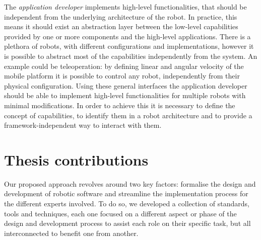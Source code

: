 The \textit{application developer} implements high-level functionalities, that should be independent from the underlying architecture of the robot. In practice, this means it should exist an abstraction layer between the low-level capabilities provided by one or more components and the high-level applications. There is a plethora of robots, with different configurations and implementations, however it is possible to abstract most of the capabilities independently from the system. An example could be teleoperation: by defining linear and angular velocity of the mobile platform it is possible to control any robot, independently from their physical configuration. Using these general interfaces the application developer should be able to implement high-level functionalities for multiple robots with minimal modifications. In order to achieve this it is necessary to define the concept of capabilities, to identify them in a robot architecture and to provide a framework-independent way to interact with them.

\section{Thesis contributions}
Our proposed approach revolves around two key factors: formalise the design and development of robotic software and streamline the implementation process for the different experts involved. To do so, we developed a collection of standards, tools and techniques, each one focused on a different aspect or phase of the design and development process to assist each role on their specific task, but all interconnected to benefit one from another.

